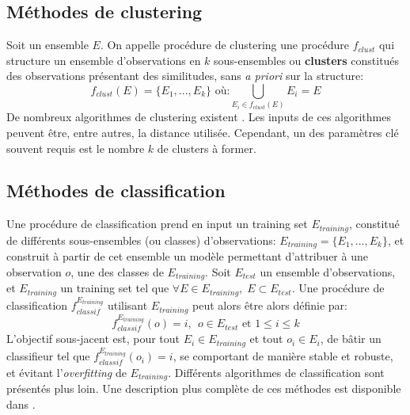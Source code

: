 \subsection{Méthodes de clustering}\label{parclusterintro}
Soit un ensemble $E$. On appelle procédure de clustering une procédure $f_{clust}$ qui structure un ensemble d'observations en $k$ sous-ensembles ou \textbf{clusters} constitués des observations présentant des similitudes, sans \textit{a priori} sur la structure:
\begin{equation}
f_{clust}(E) =\{E_{1},...,E_{k}\} \textrm{ où:} \bigcup_{E_{i} \in f_{clust}(E)}E_{i}  = E
\end{equation}
De nombreux algorithmes de clustering existent \citep{gan2007data}. Les inputs de ces algorithmes peuvent être, entre autres, la distance utilisée. Cependant, un des paramètres clé souvent requis est le nombre $k$ de clusters à former.


\subsection{Méthodes de classification}\label{parclassifintro}
Une procédure de classification prend en input un training set $E_{training}$, constitué de différents sous-ensembles (ou classes) d'observations: $E_{training}=\{E_{1},...,E_{k}\}$, et construit à partir de cet ensemble un modèle permettant d'attribuer à une observation $o$, une des classes de $E_{training}$. Soit $E_{test}$ un ensemble d'observations, et $E_{training}$ un training set tel que $\forall E \in E_{training},\; E \subset E_{test}$. Une procédure de classification $f_{classif}^{E_{training}}$ utilisant $E_{training}$ peut alors être alors définie par:
\begin{equation}
f_{classif}^{E_{training}}(o) = i,\:\: o \in E_{test} \textrm{ et } 1\leq i \leq k
\end{equation} 
L'objectif sous-jacent est, pour tout $E_{i} \in E_{training}$ et tout $o_{i} \in E_{i}$, de bâtir un classifieur tel que $f_{classif}^{E_{training}}(o_{i})=i$, se comportant de manière stable et robuste, et évitant l'\textit{overfitting} de $E_{training}$. Différents algorithmes de classification sont présentés plus loin. Une description plus complète de ces méthodes est disponible dans \citep{han2012data,witten2013data}.
